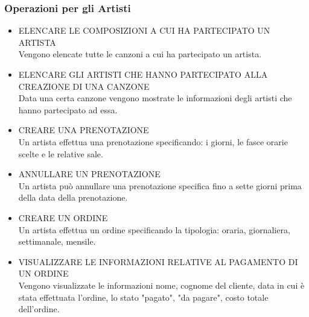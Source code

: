 \documentclass{article}
\newcounter{counteroperazioni}
\newcommand{\coperazioni}{\addtocounter{counteroperazioni}{1}\thecounteroperazioni}
\begin{document}
\subsubsection{Operazioni per gli Artisti}
\setcounter{counteroperazioni}{0}
\begin{itemize}[labelindent=1.5em,labelsep=.5cm,leftmargin=*]
    \item [\textbf{A\coperazioni)}] ELENCARE LE COMPOSIZIONI A CUI HA PARTECIPATO UN ARTISTA \\ Vengono elencate tutte le canzoni a cui ha partecipato un artista.
    \item [\textbf{A\coperazioni)}] ELENCARE GLI ARTISTI CHE HANNO PARTECIPATO ALLA CREAZIONE DI UNA CANZONE \\ Data una certa canzone vengono mostrate le informazioni degli artisti che hanno partecipato ad essa.

    \item [\textbf{A\coperazioni)}] CREARE UNA PRENOTAZIONE \\ Un artista effettua una prenotazione specificando: i giorni, le fasce orarie scelte e le relative sale. 
    \item [\textbf{A\coperazioni)}] ANNULLARE UN PRENOTAZIONE \\ Un artista può annullare una prenotazione specifica fino a sette giorni prima della data della prenotazione.
    \item [\textbf{A\coperazioni)}] CREARE UN ORDINE \\ Un artista effettua un ordine specificando la tipologia: oraria, giornaliera, settimanale, mensile.
    \item [\textbf{A\coperazioni)}] VISUALIZZARE LE INFORMAZIONI RELATIVE AL PAGAMENTO DI UN ORDINE \\ Vengono visualizzate le informazioni nome, cognome del cliente, data in cui è stata effettuata l'ordine, lo stato "pagato", "da pagare", costo totale dell'ordine. 
\end{itemize}
\end{document}
